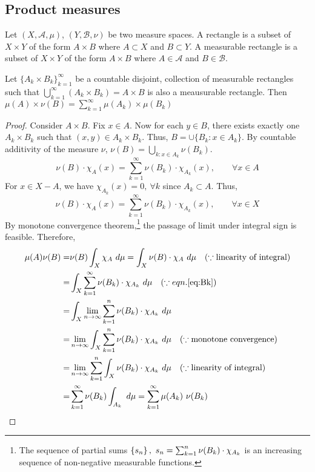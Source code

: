\subsection{Product measures}

\begin{definition}
	Let $(X,\mathcal{A},\mu)$, $(Y,\mathcal{B},\nu)$ be two measure spaces.
	A rectangle is a subset of $X \times Y$ of the form $A \times B$ where $A \subset X$ and $B \subset Y$.
	A measurable rectangle is a subset of $X \times Y$ of the form $A \times B$ where $A \in \mathcal{A}$ and $B \in \mathcal{B}$.
\end{definition}

\begin{lemma}
	Let $\{ A_k \times B_k \}_{k=1}^\infty$ be a countable disjoint, collection of measurable rectangles such that $\displaystyle \bigcup_{k=1}^\infty \left( A_k \times B_k \right) = A \times B$ is also a meausurable rectangle.
	Then
	$\displaystyle \mu(A) \times \nu(B) = \sum_{k=1}^\infty \mu(A_k) \times \mu(B_k) $
\end{lemma}
\begin{proof}
	Consider $A \times B$.
	Fix $x \in A$.
	Now for each $y \in B$, there exists exactly one $A_k \times B_k$ such that $(x,y) \in A_k \times B_k$.
	Thus, $B = \cup\{B_k : x \in A_k\}$.
	By countable additivity of the measure $\nu$, $\displaystyle \nu(B) = \bigcup_{k : x \in A_k} \nu(B_k)$.
	\begin{equation*}
		\nu(B) \cdot \chi_A(x) = \sum_{k=1}^\infty \nu(B_k) \cdot \chi_{A_k}(x),\qquad \forall x \in A
	\end{equation*}
	For $x \in X-A$, we have $\chi_{A_k}(x) = 0,\ \forall k$ since $A_k \subset A$.
	Thus,
	\begin{equation}
		\nu(B) \cdot \chi_A(x) = \sum_{k=1}^\infty \nu(B_k) \cdot \chi_{A_k}(x),\qquad \forall x \in X
		\label{eq:Bk}
	\end{equation}
	By monotone convergence theorem,\footnote{The sequence of partial sums  $\left\{s_n\right\},\ s_n = \sum_{k=1}^n \nu(B_k) \cdot \chi_{A_k}$ is an increasing sequence of non-negative measurable functions.} the passage of limit under integral sign is feasible.
	Therefore,
	\begin{align*}
		\mu(A) \nu(B) 
		= & \nu(B) \int_X \chi_A \ d\mu
		= \int_X \nu(B) \cdot \chi_A \ d\mu \quad (\because \text{linearity of integral}) \\
		= & \int_X \sum_{k=1}^\infty \nu(B_k) \cdot \chi_{A_k} \ d\mu \quad (\because eqn. \ref{eq:Bk}) \\
		= & \int_X \lim_{n \to \infty} \sum_{k=1}^n \nu(B_k) \cdot \chi_{A_k} \ d\mu \\
		= & \lim_{n \to \infty} \int_X \sum_{k=1}^n \nu(B_k) \cdot \chi_{A_k} \ d\mu \quad (\because \text{monotone convergence})\\
		= & \lim_{n \to \infty} \sum_{k=1}^n \int_X  \nu(B_k) \cdot \chi_{A_k} \ d\mu \quad (\because \text{linearity of integral})\\
		= & \sum_{k=1}^\infty \nu(B_k) \int_{A_k}\ d\mu 
		= \sum_{k=1}^\infty \mu(A_k)\ \nu(B_k)
	\end{align*}
\end{proof}

